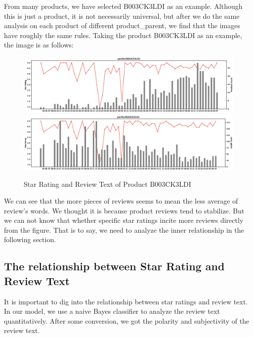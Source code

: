 \documentclass{mcmthesis}
\begin{document}
%
From many products, we have selected B003CK3LDI as an example. Although this is just a product, it is not necessarily universal, but after we do the same analysis on each product of different product\_parent, we find that the images have roughly the same rules. Taking the product B003CK3LDI as an example, the image is as follows:

\begin{figure}[ht]
    \centering
    \includegraphics[scale=0.34]{figures/TimeChart/B003CK3LDI_Feedback_Count.eps}
    \includegraphics[scale=0.34]{figures/TimeChart/B003CK3LDI_Length_Count.eps}
    \caption{Star Rating and Review Text of Product B003CK3LDI}
    \label{fig:star_review_number}
\end{figure}
We can see that the more pieces of reviews seems to mean the less average of review's words. We thought it is because product reviews tend to stabilize. But we can not know that whether specific star ratings incite more reviews directly from the figure. That is to say, we need to analyze the inner relationship in the following section.



\subsection{The relationship between Star Rating and Review Text}

    It is important to dig into the relationship between star ratings and review text. In our model, we use a naive Bayes classifier to analyze the review text quantitatively. After some conversion, we got the polarity and subjectivity of the review text.
    
\end{document}
